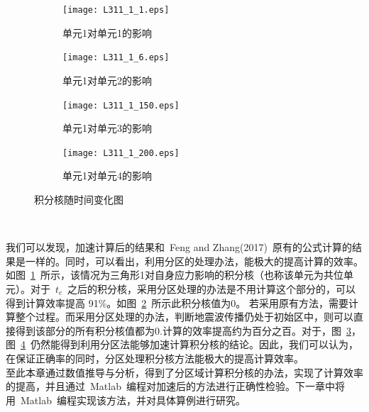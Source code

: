  \begin{figure}[htb]
  \centering
  \begin{subfigure}[b]{0.45\linewidth}
    \texttt{[image: L311\_1\_1.eps]}
    \caption{单元1对单元1的影响}\label{fig:danyuan1}
  \end{subfigure}
  \begin{subfigure}[b]{0.45\linewidth}
    \texttt{[image: L311\_1\_6.eps]}
    \caption{单元1对单元2的影响}\label{fig:danyuan2}
  \end{subfigure}
  \begin{subfigure}[b]{0.45\linewidth}
    \texttt{[image: L311\_1\_150.eps]}
    \caption{单元1对单元3的影响}\label{fig:danyuan3}
  \end{subfigure}
  \begin{subfigure}[b]{0.45\linewidth}
    \texttt{[image: L311\_1\_200.eps]}
    \caption{单元1对单元4的影响}\label{fig:danyuan4}
  \end{subfigure}
  \caption{积分核随时间变化图}\label{fig:demenstrate}
\end{figure}
\\

\indent 我们可以发现，加速计算后的结果和~Feng and Zhang(2017)~原有的公式计算的结果是一样的。同时，可以看出，利用分区的处理办法，能极大的提高计算的效率。如图~\ref{fig:danyuan1}~所示，该情况为三角形1对自身应力影响的积分核（也称该单元为共位单元）。对于~$t_c$~之后的积分核，采用分区处理的办法是不用计算这个部分的，可以得到计算效率提高 91\%。如图~\ref{fig:danyuan2}~所示此积分核值为0。 若采用原有方法，需要计算整个过程。而采用分区处理的办法，判断地震波传播仍处于初始区中，则可以直接得到该部分的所有积分核值都为0.计算的效率提高约为百分之百。对于，图~\ref{fig:danyuan3}，图~\ref{fig:danyuan4}~仍然能得到利用分区法能够加速计算积分核的结论。因此，我们可以认为，在保证正确率的同时，分区处理积分核方法能极大的提高计算效率。\\
    \indent 至此本章通过数值推导与分析，得到了分区域计算积分核的办法，实现了计算效率的提高，并且通过~Matlab~编程对加速后的方法进行正确性检验。下一章中将用~Matlab~编程实现该方法，并对具体算例进行研究。

